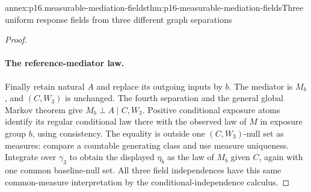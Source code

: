 \begin{annexitem}{annex:p16.measurable-mediation-fields}{thm:p16-measurable-mediation-fields}{Three uniform response fields from three different graph separations}
\begin{proof}
\paragraph{The reference-mediator law.}
Finally retain natural \(A\) and replace its outgoing inputs by
\(b\). The mediator is \(M_b\), and \((C,W_3)\) is unchanged.
The fourth separation and the general global Markov theorem give
\(M_b\perp A\mid C,W_3\). Positive conditional exposure atoms
identify its regular conditional law there with the observed law
of \(M\) in exposure group \(b\), using consistency. The equality
is outside one \((C,W_3)\)-null set as measures: compare a countable
generating class and use measure uniqueness. Integrate over
\(\gamma_3\) to obtain the displayed \(\eta_b\) as the law of
\(M_b\) given \(C\), again with one common baseline-null set.
All three field independences have this same common-measure
interpretation by the conditional-independence calculus.
\end{proof}
\end{annexitem}

